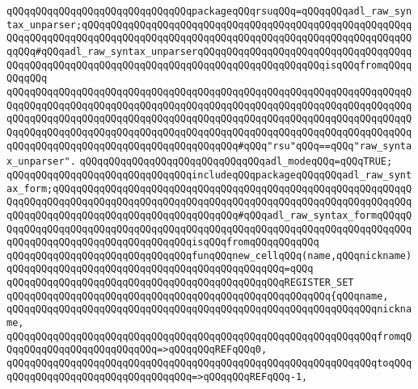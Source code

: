 \verb|qQQqqQQqqQQqqQQqqQQqqQQqqQQqqQQqpackageqQQqrsuqQQq=qQQqqQQqadl_raw_syntax_unparser;qQQqqQQqqQQqqQQqqQQqqQQqqQQqqQQqqQQqqQQqqQQqqQQqqQQqqQQqqQQqqQQqqQQqqQQqqQQqqQQqqQQqqQQqqQQqqQQqqQQqqQQqqQQqqQQqqQQqqQQqqQQqqQQqqQQq#qQQqadl_raw_syntax_unparserqQQqqQQqqQQqqQQqqQQqqQQqqQQqqQQqqQQqqQQqqQQqqQQqqQQqqQQqqQQqqQQqqQQqqQQqqQQqqQQqqQQqqQQqqQQqisqQQqfromqQQqqQQqqQQq|\newline
\verb|qQQqqQQqqQQqqQQqqQQqqQQqqQQqqQQqqQQqqQQqqQQqqQQqqQQqqQQqqQQqqQQqqQQqqQQqqQQqqQQqqQQqqQQqqQQqqQQqqQQqqQQqqQQqqQQqqQQqqQQqqQQqqQQqqQQqqQQqqQQqqQQqqQQqqQQqqQQqqQQqqQQqqQQqqQQqqQQqqQQqqQQqqQQqqQQqqQQqqQQqqQQqqQQqqQQqqQQqqQQqqQQqqQQqqQQqqQQqqQQqqQQqqQQqqQQqqQQqqQQqqQQqqQQqqQQqqQQqqQQqqQQqqQQqqQQqqQQqqQQqqQQqqQQqqQQqqQQqqQQq#qQQq"rsu"qQQq==qQQq"raw_syntax_unparser".|\newline
\verb|qQQqqQQqqQQqqQQqqQQqqQQqqQQqqQQqadl_modeqQQq=qQQqTRUE;|\newline
\newline
\verb|qQQqqQQqqQQqqQQqqQQqqQQqqQQqqQQqincludeqQQqpackageqQQqqQQqadl_raw_syntax_form;qQQqqQQqqQQqqQQqqQQqqQQqqQQqqQQqqQQqqQQqqQQqqQQqqQQqqQQqqQQqqQQqqQQqqQQqqQQqqQQqqQQqqQQqqQQqqQQqqQQqqQQqqQQqqQQqqQQqqQQqqQQqqQQqqQQqqQQqqQQqqQQqqQQqqQQqqQQqqQQqqQQqqQQqqQQq#qQQqadl_raw_syntax_formqQQqqQQqqQQqqQQqqQQqqQQqqQQqqQQqqQQqqQQqqQQqqQQqqQQqqQQqqQQqqQQqqQQqqQQqqQQqqQQqqQQqqQQqqQQqqQQqqQQqqQQqqQQqisqQQqfromqQQqqQQqqQQq|\newline
\newline
\verb|qQQqqQQqqQQqqQQqqQQqqQQqqQQqqQQqfunqQQqnew_cellqQQq(name,qQQqnickname)|\newline
\verb|qQQqqQQqqQQqqQQqqQQqqQQqqQQqqQQqqQQqqQQqqQQqqQQq=qQQq|\newline
\verb|qQQqqQQqqQQqqQQqqQQqqQQqqQQqqQQqqQQqqQQqqQQqqQQqREGISTER_SET|\newline
\verb|qQQqqQQqqQQqqQQqqQQqqQQqqQQqqQQqqQQqqQQqqQQqqQQqqQQqqQQq{qQQqname,|\newline
\verb|qQQqqQQqqQQqqQQqqQQqqQQqqQQqqQQqqQQqqQQqqQQqqQQqqQQqqQQqqQQqqQQqnickname,|\newline
\verb|qQQqqQQqqQQqqQQqqQQqqQQqqQQqqQQqqQQqqQQqqQQqqQQqqQQqqQQqqQQqqQQqfromqQQqqQQqqQQqqQQqqQQqqQQqqQQq=>qQQqqQQqREFqQQq0,|\newline
\verb|qQQqqQQqqQQqqQQqqQQqqQQqqQQqqQQqqQQqqQQqqQQqqQQqqQQqqQQqqQQqqQQqtoqQQqqQQqqQQqqQQqqQQqqQQqqQQqqQQqqQQq=>qQQqqQQqREFqQQq-1,|\newline
